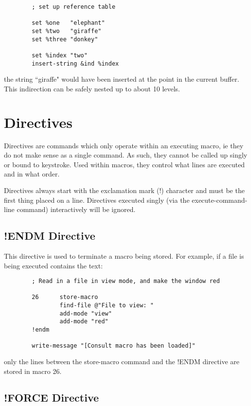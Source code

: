 \begin{verbatim}
        ; set up reference table

        set %one   "elephant"
        set %two   "giraffe"
        set %three "donkey"

        set %index "two"
        insert-string &ind %index
\end{verbatim}

the string ``giraffe" would have been inserted at the point in
the current buffer.  This indirection can be safely nested up to about
10 levels.

\section{Directives}

Directives are commands which only operate within an executing
macro, ie they do not make sense as a single command. As such, they
cannot be called up singly or bound to keystroke. Used within macros,
they control what lines are executed and in what order.

Directives always start with the exclamation mark (!) character
and must be the first thing placed on a line. Directives executed singly
(via the execute-command-line command) interactively will be ignored.

\subsection{!ENDM Directive}

This directive is used to terminate a macro being stored. For
example, if a file is being executed contains the text:

\begin{verbatim}
        ; Read in a file in view mode, and make the window red

        26      store-macro
                find-file @"File to view: "
                add-mode "view"
                add-mode "red"
        !endm

        write-message "[Consult macro has been loaded]"
\end{verbatim}

only the lines between the store-macro command and the !ENDM
directive are stored in macro 26.

\subsection{!FORCE Directive}

